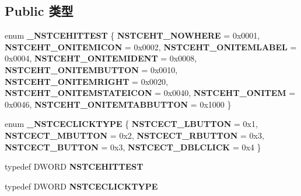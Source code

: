 \subsection*{Public 类型}
\begin{DoxyCompactItemize}
\item 
\mbox{\label{interface_i_name_space_tree_control_events_ab9a2af2a393b30c835890ca2a358277a}} 
enum {\bfseries \+\_\+\+N\+S\+T\+C\+E\+H\+I\+T\+T\+E\+ST} \{ \newline
{\bfseries N\+S\+T\+C\+E\+H\+T\+\_\+\+N\+O\+W\+H\+E\+RE} = 0x0001, 
{\bfseries N\+S\+T\+C\+E\+H\+T\+\_\+\+O\+N\+I\+T\+E\+M\+I\+C\+ON} = 0x0002, 
{\bfseries N\+S\+T\+C\+E\+H\+T\+\_\+\+O\+N\+I\+T\+E\+M\+L\+A\+B\+EL} = 0x0004, 
{\bfseries N\+S\+T\+C\+E\+H\+T\+\_\+\+O\+N\+I\+T\+E\+M\+I\+D\+E\+NT} = 0x0008, 
\newline
{\bfseries N\+S\+T\+C\+E\+H\+T\+\_\+\+O\+N\+I\+T\+E\+M\+B\+U\+T\+T\+ON} = 0x0010, 
{\bfseries N\+S\+T\+C\+E\+H\+T\+\_\+\+O\+N\+I\+T\+E\+M\+R\+I\+G\+HT} = 0x0020, 
{\bfseries N\+S\+T\+C\+E\+H\+T\+\_\+\+O\+N\+I\+T\+E\+M\+S\+T\+A\+T\+E\+I\+C\+ON} = 0x0040, 
{\bfseries N\+S\+T\+C\+E\+H\+T\+\_\+\+O\+N\+I\+T\+EM} = 0x0046, 
\newline
{\bfseries N\+S\+T\+C\+E\+H\+T\+\_\+\+O\+N\+I\+T\+E\+M\+T\+A\+B\+B\+U\+T\+T\+ON} = 0x1000
 \}
\item 
\mbox{\label{interface_i_name_space_tree_control_events_a976f7a7fc923f90f1fce63bad262fc62}} 
enum {\bfseries \+\_\+\+N\+S\+T\+C\+E\+C\+L\+I\+C\+K\+T\+Y\+PE} \{ \newline
{\bfseries N\+S\+T\+C\+E\+C\+T\+\_\+\+L\+B\+U\+T\+T\+ON} = 0x1, 
{\bfseries N\+S\+T\+C\+E\+C\+T\+\_\+\+M\+B\+U\+T\+T\+ON} = 0x2, 
{\bfseries N\+S\+T\+C\+E\+C\+T\+\_\+\+R\+B\+U\+T\+T\+ON} = 0x3, 
{\bfseries N\+S\+T\+C\+E\+C\+T\+\_\+\+B\+U\+T\+T\+ON} = 0x3, 
\newline
{\bfseries N\+S\+T\+C\+E\+C\+T\+\_\+\+D\+B\+L\+C\+L\+I\+CK} = 0x4
 \}
\item 
\mbox{\label{interface_i_name_space_tree_control_events_a5ccb628bed8e0abbee595abdc4d28879}} 
typedef D\+W\+O\+RD {\bfseries N\+S\+T\+C\+E\+H\+I\+T\+T\+E\+ST}
\item 
\mbox{\label{interface_i_name_space_tree_control_events_a8bbd513cd39895f64fc9a2f63dfa6701}} 
typedef D\+W\+O\+RD {\bfseries N\+S\+T\+C\+E\+C\+L\+I\+C\+K\+T\+Y\+PE}
\end{DoxyCompactItemize}
